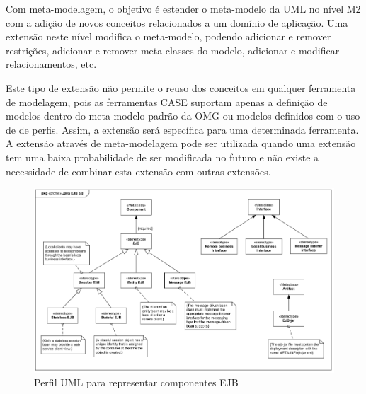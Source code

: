 Com meta-modelagem, o objetivo é estender o meta-modelo da UML no nível M2 com a adição de novos conceitos relacionados a um domínio de aplicação. Uma
extensão neste nível modifica o meta-modelo, podendo adicionar e remover restrições, adicionar e remover meta-classes do modelo, adicionar e
modificar relacionamentos, etc. 

Este tipo de extensão não permite o reuso dos conceitos em qualquer ferramenta de modelagem, pois as ferramentas CASE suportam apenas a definição de
modelos dentro do meta-modelo padrão da OMG ou modelos definidos com o uso de de perfis. Assim, a extensão será específica para uma determinada
ferramenta. A extensão através de meta-modelagem pode ser utilizada quando uma extensão tem uma baixa probabilidade de ser modificada no futuro e não
existe a necessidade de combinar esta extensão com outras extensões.

\begin{landscape}
\begin{figure}[!H]
	\centering
	\includegraphics{img/ejb_profile.png}
	\caption{Perfil UML para representar componentes EJB \cite{ejbprofile:12}}\label{fig:ejb_profile}
\end{figure}
\end{landscape}